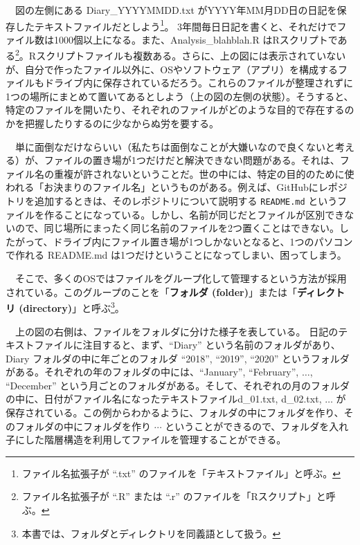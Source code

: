 \documentclass[
  a4paper,
  pandoc,
  ja=standard,
  jafont=haranoaji]{bxjsbook}
\begin{document}
　図の左側にある Diary\_YYYYMMDD.txt
がYYYY年MM月DD日の日記を保存したテキストファイルだとしよう\footnote{ファイル名拡張子が
  ``.txt'' のファイルを「テキストファイル」と呼ぶ。}。
3年間毎日日記を書くと、それだけでファイル数は1000個以上になる。また、Analysis\_blahblah.R
はRスクリプトである\footnote{ファイル名拡張子が ``.R'' または ``.r''
  のファイルを「Rスクリプト」と呼ぶ。}。Rスクリプトファイルも複数ある。さらに、上の図には表示されていないが、自分で作ったファイル以外に、OSやソフトウェア（アプリ）を構成するファイルもドライブ内に保存されているだろう。これらのファイルが整理されずに1つの場所にまとめて置いてあるとしよう（上の図の左側の状態）。そうすると、特定のファイルを開いたり、それぞれのファイルがどのような目的で存在するのかを把握したりするのに少なからぬ労を要する。

　単に面倒なだけならいい（私たちは面倒なことが大嫌いなので良くないと考える）が、ファイルの置き場が1つだけだと解決できない問題がある。それは、ファイル名の重複が許されないということだ。世の中には、特定の目的のために使われる「お決まりのファイル名」というものがある。例えば、GitHubにレポジトリを追加するときは、そのレポジトリについて説明する
\texttt{README.md}
というファイルを作ることになっている。しかし、名前が同じだとファイルが区別できないので、同じ場所にまったく同じ名前のファイルを2つ置くことはできない。したがって、ドライブ内にファイル置き場が1つしかないとなると、1つのパソコンで作れる
README.md は1つだけということになってしまい、困ってしまう。

　そこで、多くのOSではファイルをグループ化して管理するという方法が採用されている。このグループのことを「\textbf{フォルダ
(folder)}」または「\textbf{ディレクトリ
(directory)}」と呼ぶ\footnote{本書では、フォルダとディレクトリを同義語として扱う。}。

　上の図の右側は、ファイルをフォルダに分けた様子を表している。
日記のテキストファイルに注目すると、まず、``Diary''
という名前のフォルダがあり、Diary フォルダの中に年ごとのフォルダ
``2018'', ``2019'', ``2020''
というフォルダがある。それぞれの年のフォルダの中には、``January'',
``February'', \(\dots\), ``December''
という月ごとのフォルダがある。そして、それぞれの月のフォルダの中に、日付がファイル名になったテキストファイルd\_01.txt,
d\_02.txt, \(\dots\)
が保存されている。この例からわかるように、フォルダの中にフォルダを作り、そのフォルダの中にフォルダを作り
\(\cdots\)
ということができるので、フォルダを入れ子にした階層構造を利用してファイルを管理することができる。
\end{document}
